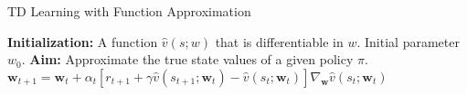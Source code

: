 \documentclass{article}
\begin{document}
\begin{algorithm}
  \caption{TD Learning with Function Approximation}\label{alg:td_learning}
  \begin{algorithmic}
    \State \textbf{Initialization:} A function $\hat{v}{(s; w)}$ that is differentiable in $w$.
     \State Initial parameter $w_0$.
    \State \textbf{Aim:} Approximate the true state values of a given policy $\pi$.
        \State $\mathbf{w}_{t+1} = \mathbf{w}_t + \alpha_t \left[ r_{t+1} + \gamma \hat{v}{(s_{t+1}; \mathbf{w}_t)} - \hat{v}{(s_t; \mathbf{w}_t)} \right] \nabla_\mathbf{w} \hat{v}{(s_t; \mathbf{w}_t)}$
      \EndFor
    \EndFor
  \end{algorithmic}
\end{algorithm}
\end{document}
